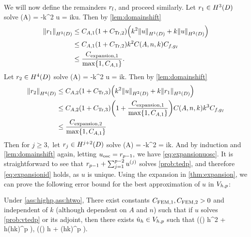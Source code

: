 We will now define the remainders $r_{l}$, and proceed similarly.
Let $\ro \in \HthD$ solve
\beqs
\grad \cdot \mleft(A\grad \ro\mright) = -k^2 u
\eeqs
\beqs
\dn \ro = iku.
\eeqs
Then by \cref{lem:domainshift}
\begin{align*}
\NHthD{\ro} &\leq \CAo\mleft(1+\CTrt\mright)\mleft(k^2\NHoD{u} + k\NHtD{u}\mright)\\
&\leq \CAo\mleft(1+\CTrt\mright)k^2\CAnk\Cfg\\
&\leq \frac{\Cefn{1}}{\max\set{1,\CAo}}.
\end{align*}
Let $\rt \in \HfD$ solve
\beqs
\grad \cdot \mleft(A\grad \rt\mright) = -k^2 u
\eeqs
\beqs
\dn \rt = ik\ro.
\eeqs
Then by \cref{lem:domainshift}
\begin{align*}
\NHfD{\rt} &\leq \CAt\mleft(1+\CTrth\mright)\mleft(k^2\NHtD{u} + k\NHthD{\ro}\mright)\\
&\leq \CAt\mleft(1+\CTrth\mright)\mleft(1 + \frac{\Cefn{1}}{\max\set{1,\CAo}}\mright)\CAnk k^3\Cfg\\
&\leq \frac{\Cefn{2}}{\max\set{1,\CAo}}
\end{align*}
Then for $j \geq 3,$ let $\rj \in \HjptD$ solve
\beqs
\grad \cdot \mleft(A\grad \rt\mright) = -k^2 \rjmt
\eeqs
\beqs
\dn \rj = ik\rjmo.
\eeqs
And by induction and \cref{lem:domainshift} again, letting $u_{\mathrm{osc}} = r_{p-1},$ we have \cref{eq:expansionuosc}. It is straightforward to see that $r_{p-1} + \sum_{j=1}^{p-2} u^{(j)}$ solves \cref{prob:tedp}, and therefore \cref{eq:expansionid} holds, as $u$ is unique.
\epf
Using the expansion in \cref{thm:expansion}, we can prove the following error bound for the best approximation of $u$ in $V_{h,p}$:


\label{lem:bestapprox}
Under \cref{ass:highp,ass:htwo}, There exist constants $C_{\mathrm{FEM},1}, C_{\mathrm{FEM},2} > 0$ and independent of $k$ (although dependent on $A$ and $n$) such that if $u$ solves \cref{prob:vtedp} or its adjoint, then there exists $\hat{u}_{h} \in V_{h,p}$ such that
\beq\label{eq:bestapproxL2}
 \leq \mleft(\CFEMo {}\mleft(\mright) h^2 + \CFEMt \CAnk h\mleft(hk\mright)^p \mright)\Cfg,
\eeq
\beq\label{eq:bestapproxW}
 \mleft(\CFEMo {}\mleft(\mright) h + \CFEMt \CAnk \mleft(hk\mright)^p \mright)\Cfg.
\eeq
\ele

